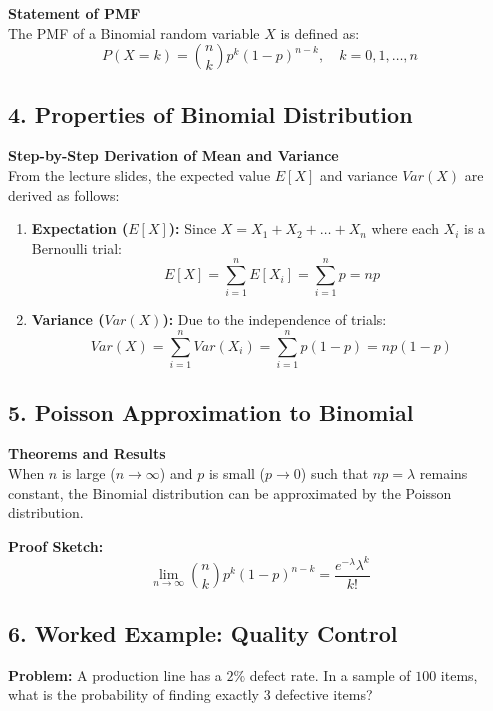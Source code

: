 \documentclass[11pt]{article}
\begin{document}
\textbf{Statement of PMF} \\
The PMF of a Binomial random variable $X$ is defined as:
\begin{equation}
    P(X=k) = \binom{n}{k} p^k (1-p)^{n-k}, \quad k=0, 1, \dots, n
\end{equation}

\subsection*{4. Properties of Binomial Distribution}
\textbf{Step-by-Step Derivation of Mean and Variance} \\
From the lecture slides, the expected value $E[X]$ and variance $Var(X)$ are derived as follows:
\begin{enumerate}
    \item \textbf{Expectation ($E[X]$):} Since $X = X_1 + X_2 + \dots + X_n$ where each $X_i$ is a Bernoulli trial:
    \begin{equation}
        E[X] = \sum_{i=1}^n E[X_i] = \sum_{i=1}^n p = np
    \end{equation}
    \item \textbf{Variance ($Var(X)$):} Due to the independence of trials:
    \begin{equation}
        Var(X) = \sum_{i=1}^n Var(X_i) = \sum_{i=1}^n p(1-p) = np(1-p)
    \end{equation}
\end{enumerate}

\subsection*{5. Poisson Approximation to Binomial}
\textbf{Theorems and Results} \\
When $n$ is large ($n \to \infty$) and $p$ is small ($p \to 0$) such that $np = \lambda$ remains constant, the Binomial distribution can be approximated by the Poisson distribution.

\textbf{Proof Sketch:}
\begin{equation}
    \lim_{n \to \infty} \binom{n}{k} p^k (1-p)^{n-k} = \frac{e^{-\lambda} \lambda^k}{k!}
\end{equation}

\subsection*{6. Worked Example: Quality Control}
\textbf{Problem:} A production line has a $2\%$ defect rate. In a sample of $100$ items, what is the probability of finding exactly $3$ defective items?
\end{document}
